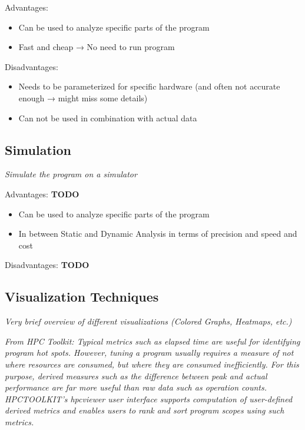 Advantages:
\begin{itemize}
  \item Can be used to analyze specific parts of the program
  \item Fast and cheap → No need to run program
\end{itemize}
Disadvantages:
\begin{itemize}
  \item Needs to be parameterized for specific hardware (and often not accurate enough → might miss some details)
  \item Can not be used in combination with actual data
\end{itemize}

\subsection{Simulation}\label{sec:simulation}
\textit{Simulate the program on a simulator}
\cite{schaad2022boosting,hammer2017kerncraft,choudhury2011abstract,iakymchuk2012modeling}

Advantages:
\textbf{TODO}
\begin{itemize}
  \item Can be used to analyze specific parts of the program
  \item In between Static and Dynamic Analysis in terms of precision and speed and cost
\end{itemize}
Disadvantages:
\textbf{TODO}

\subsection{Visualization Techniques}\label{sec:visualization}
\textit{Very brief overview of different visualizations (Colored Graphs, Heatmaps, etc.)}

\textit{From HPC Toolkit: Typical metrics such as elapsed time
are useful for identifying program hot spots. However, tuning a program usually requires a measure
of not where resources are consumed, but where they are consumed inefficiently. For this purpose,
derived measures such as the difference between peak and actual performance are far more useful than
raw data such as operation counts. HPCTOOLKIT’s hpcviewer user interface supports computation
of user-defined derived metrics and enables users to rank and sort program scopes using such metrics.}
